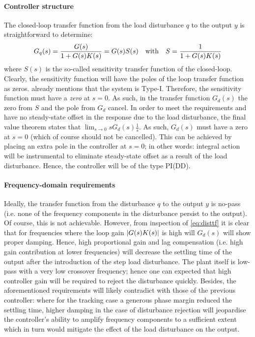 \paragraph{Controller structure}
The closed-loop transfer function from the load disturbance $q$ to the output $y$ is straightforward to determine:
\begin{equation}
    G_q(s) = \frac{G(s)}{1 + G(s)K(s)} = G(s)S(s)\qq{with}S = \frac{1}{1 + G(s)K(s)}
    \label{eq:disttf}
\end{equation}
where $S(s)$ is the so-called sensitivity transfer function of the closed-loop. Clearly, the sensitivity function will have the poles of the loop transfer function as zeros.  already mentions that the system is Type-I. Therefore, the sensitivity function must have a \textit{zero} at $s = 0$. As such, in the transfer function $G_d(s)$ the zero from $S$ and the pole from $G_d$ cancel. In order to meet the requirements and have no steady-state offset in the response due to the load disturbance, the final value theorem states that $\lim_{s\to 0} sG_d(s)\frac{1}{s}$. As such, $G_d(s)$ must have a zero at $s = 0$ (which of course should not be cancelled). This can be achieved by placing an extra pole in the controller at $s = 0$; in other words: integral action will be instrumental to eliminate steady-state offset as a result of the load disturbance. Hence, the controller will be of the type PI(DD).

\paragraph{Frequency-domain requirements}
Ideally, the transfer function from the disturbance $q$ to the output $y$ is no-pass (i.e. none of the frequency components in the disturbance persist to the output). Of course, this is not achievable. However, from inspection of \cref{eq:disttf} it is clear that for frequencies where the loop gain $\abs{G(s)K(s)}$ is high will $G_d(s)$ will show proper damping. Hence, high proportional gain and lag compensation (i.e. high gain contribution at lower frequencies) will decrease the settling time of the output after the introduction of the step load disturbance. The plant itself is low-pass with a very low crossover frequency; hence one can expected that high controller gain will be required to reject the disturbance quickly. Besides, the aforementioned requirements will likely contradict with those of the previous controller: where for the tracking case a generous phase margin reduced the settling time, higher damping in the case of disturbance rejection will jeopardise the controller's ability to amplify frequency components to a sufficient extent which in turn would mitigate the effect of the load disturbance on the output.


